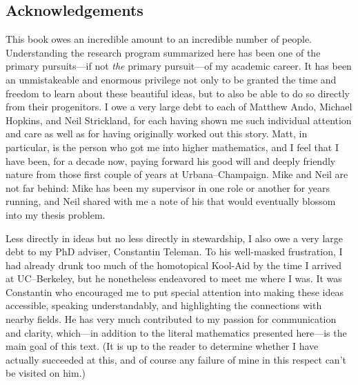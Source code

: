 


\newpage

\subsection*{Acknowledgements}


This book owes an incredible amount to an incredible number of people.  Understanding the research program summarized here has been one of the primary pursuits---if not \emph{the} primary pursuit---of my academic career.  It has been an unmistakeable and enormous privilege not only to be granted the time and freedom to learn about these beautiful ideas, but to also be able to do so directly from their progenitors.  I owe a very large debt to each of Matthew Ando, Michael Hopkins, and Neil Strickland, for each having shown me such individual attention and care as well as for having originally worked out this story.  Matt, in particular, is the person who got me into higher mathematics, and I feel that I have been, for a decade now, paying forward his good will and deeply friendly nature from those first couple of years at Urbana--Champaign.  Mike and Neil are not far behind: Mike has been my supervisor in one role or another for years running, and Neil shared with me a note of his that would eventually blossom into my thesis problem.

Less directly in ideas but no less directly in stewardship, I also owe a very large debt to my PhD adviser, Constantin Teleman.  To his well-masked frustration, I had already drunk too much of the homotopical Kool-Aid by the time I arrived at UC--Berkeley, but he nonetheless endeavored to meet me where I was.  It was Constantin who encouraged me to put special attention into making these ideas accessible, speaking understandably, and highlighting the connections with nearby fields.  He has very much contributed to my passion for communication and clarity, which---in addition to the literal mathematics presented here---is the main goal of this text.  (It is up to the reader to determine whether I have actually succeeded at this, and of course any failure of mine in this respect can't be visited on him.)

